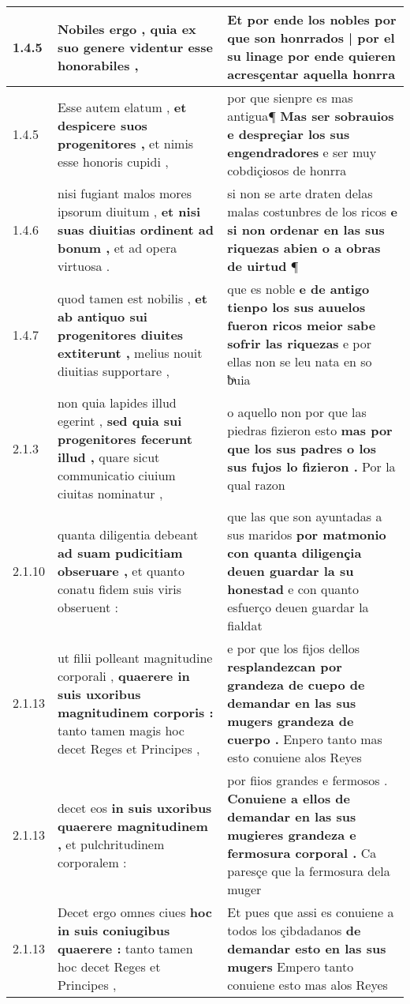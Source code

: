 \begin{tabular}{|p{1cm}|p{6.5cm}|p{6.5cm}|}
1.4.5 & Nobiles ergo , \textbf{ quia ex suo genere videntur } esse honorabiles , & Et por ende los nobles \textbf{ por que son honrrados | por el su linage } por ende quieren acresçentar aquella honrra \\\hline
1.4.5 & Esse autem elatum , \textbf{ et despicere suos progenitores , } et nimis esse honoris cupidi , & por que sienpre es mas antigua¶ \textbf{ Mas ser sobrauios e despreçiar los sus engendradores } e ser muy cobdiçiosos de honrra \\\hline
1.4.6 & nisi fugiant malos mores ipsorum diuitum , \textbf{ et nisi suas diuitias ordinent ad bonum , } et ad opera virtuosa . & si non se arte draten delas malas costunbres de los ricos \textbf{ e si non ordenar en las sus riquezas abien o a obras de uirtud } ¶ \\\hline
1.4.7 & quod tamen est nobilis , \textbf{ et ab antiquo sui progenitores diuites extiterunt , } melius nouit diuitias supportare , & que es noble \textbf{ e de antigo tienpo los sus auuelos fueron ricos meior sabe sofrir las riquezas } e por ellas non se leu nata en so ƀͣuia \\\hline
2.1.3 & non quia lapides illud egerint , \textbf{ sed quia sui progenitores fecerunt illud , } quare sicut communicatio ciuium ciuitas nominatur , & o aquello non por que las piedras fizieron esto \textbf{ mas por que los sus padres o los sus fujos lo fizieron . } Por la qual razon \\\hline
2.1.10 & quanta diligentia debeant \textbf{ ad suam pudicitiam obseruare , } et quanto conatu fidem suis viris obseruent : & que las que son ayuntadas a sus maridos \textbf{ por matmonio con quanta diligençia deuen guardar la su honestad } e con quanto esfuerço deuen guardar la fialdat \\\hline
2.1.13 & ut filii polleant magnitudine corporali , \textbf{ quaerere in suis uxoribus magnitudinem corporis : } tanto tamen magis hoc decet Reges et Principes , & e por que los fijos dellos \textbf{ resplandezcan por grandeza de cuepo de demandar en las sus mugers grandeza de cuerpo . } Enpero tanto mas esto conuiene alos Reyes \\\hline
2.1.13 & decet eos \textbf{ in suis uxoribus quaerere magnitudinem , } et pulchritudinem corporalem : & por fiios grandes e fermosos . \textbf{ Conuiene a ellos de demandar en las sus mugieres grandeza e fermosura corporal . } Ca paresçe que la fermosura dela muger \\\hline
2.1.13 & Decet ergo omnes ciues \textbf{ hoc in suis coniugibus quaerere : } tanto tamen hoc decet Reges et Principes , & Et pues que assi es conuiene a todos los çibdadanos \textbf{ de demandar esto en las sus mugers } Empero tanto conuiene esto mas alos Reyes \\\hline

\end{tabular}
